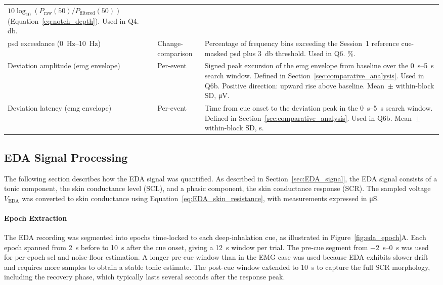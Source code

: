{\begin{xltabular}{\widetable}{>{\raggedright\arraybackslash}p{3.6cm} l >{\raggedright\arraybackslash}X}
$10\log_{10}(P_\text{raw}(50) / P_\text{filtered}(50))$ (Equation~\ref{eq:notch_depth}). Used in Q4. \si{\decibel}. \\
\addlinespace
\gls{psd} exceedance (\SIrange{0}{10}{\hertz}) & Change-comparison &
Percentage of frequency bins exceeding the Session~1 reference cue-masked \gls{psd} plus \SI{3}{\decibel} threshold. Used in Q6. \si{\percent}. \\
\addlinespace
Deviation amplitude (\gls{emg} envelope) & Per-event &
Signed peak excursion of the \gls{emg} envelope from baseline over the \SIrange{0}{5}{\second} search window. Defined in Section~\ref{sec:comparative_analysis}. Used in Q6b. Positive direction: upward rise above baseline. Mean~$\pm$ within-block SD, \si{\micro\volt}. \\
\addlinespace
Deviation latency (\gls{emg} envelope) & Per-event &
Time from cue onset to the deviation peak in the \SIrange{0}{5}{\second} search window. Defined in Section~\ref{sec:comparative_analysis}. Used in Q6b. Mean~$\pm$ within-block SD, \si{\second}. \\
\end{xltabular}
}

\FloatBarrier

\subsection{EDA Signal Processing}
\label{sec:eda_processing}

The following section describes how the EDA signal was quantified. As described in Section~\ref{sec:EDA_signal}, the EDA signal consists of a tonic component, the skin conductance level (SCL), and a phasic component, the skin conductance response (SCR). The sampled voltage $V_\text{EDA}$ was converted to skin conductance using Equation~\ref{eq:EDA_skin_resistance}, with measurements expressed in \si{\micro\siemens}.

\paragraph{Epoch Extraction}
The EDA recording was segmented into epochs time-locked to each deep-inhalation cue, as illustrated in Figure~\ref{fig:eda_epoch}A. Each epoch spanned from \SI{2}{\second} before to \SI{10}{\second} after the cue onset, giving a \SI{12}{\second} window per trial. The pre-cue segment from \SIrange{-2}{0}{\second} was used for per-epoch \gls{scl} and noise-floor estimation. A longer pre-cue window than in the EMG case was used because EDA exhibits slower drift and requires more samples to obtain a stable tonic estimate. The post-cue window extended to \SI{10}{\second} to capture the full SCR morphology, including the recovery phase, which typically lasts several seconds after the response peak.

